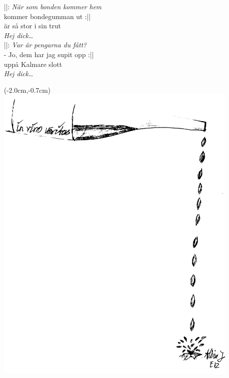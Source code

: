 \noindent ||: \textit{När som bonden kommer hem}\\
\noindent kommer bondegumman ut :||\\
\noindent är så stor i sin trut\\
\noindent \textit{Hej dick…}\\

\noindent ||: \textit{Var är pengarna du fått?}\\
\noindent - Jo, dem har jag supit opp :||\\
\noindent uppå Kalmare slott\\
\noindent \textit{Hej dick…}\\


\newpage
\noBackground

\begin{textblock*}{3cm}(-2.0cm,-0.7cm) %
    \includegraphics[width=12cm]{./bilder/in_vino_veritas.png}
\end{textblock*}


